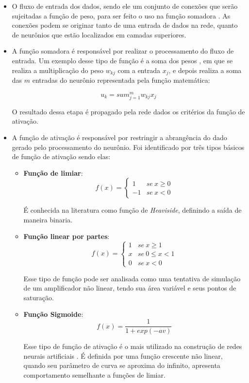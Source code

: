 \begin{itemize}
\item O fluxo de entrada dos dados, sendo ele um conjunto de conexões que serão sujeitadas a função de peso, para ser feito o uso na função somadora \cite{haykin2001}. As conexões podem se originar tanto de uma entrada de dados na rede, quanto de neurônios que estão localizados em camadas superiores.
\item A função somadora é responsável por realizar o processamento do fluxo de entrada.
Um exemplo desse tipo de função é a soma dos pesos \cite{Kriesel2007NeuralNetworks}, em que se realiza a multiplicação do peso $w_{kj}$ com a entrada $x_j$, e depois realiza a soma das $m$ entradas do neurônio representada pela função matemática:
\par \[u_k = sum_{j=1}^{m} w_{kj}x_j\]
\par O resultado dessa etapa é propagado pela rede dados os critérios da função de ativação.
\item A função de ativação é responsável por restringir a abrangência do dado gerado pelo processamento do neurônio. Foi identificado por  três tipos básicos de função de ativação sendo elas:
  \begin{itemize}
    \item \textbf{Função de limiar}:
\[ f(x)= \begin{cases} 1&se \ x \ge 0 \\ -1 & se\ x < 0 \end{cases} \]
      \par É conhecida na literatura como função de \textit{Heaviside}, definindo a saída de maneira binaria.
    \item \textbf{Função linear por partes}: 
\[ f(x)= \begin{cases} 1&se \ x \ge 1 \\x & se\ 0\le x < 1 \\ 0 & se\ x < 0 \end{cases} \]
      \par Esse tipo de função pode ser analisada como uma tentativa de simulação de um amplificador não linear, tendo sua área variável e seus pontos de saturação. 
    \item \textbf{Função Sigmoide}: 
\[ f(x)= \frac{1}{1 + exp(-av)} \]
      \par Esse tipo de função de ativação é o mais utilizado na construção de redes neurais artificiais \cite{haykin2001}. É definida por uma função crescente não linear, quando seu parâmetro de curva se aproxima do infinito, apresenta comportamento semelhante a funções de limiar.
  \end{itemize}
\end{itemize}
